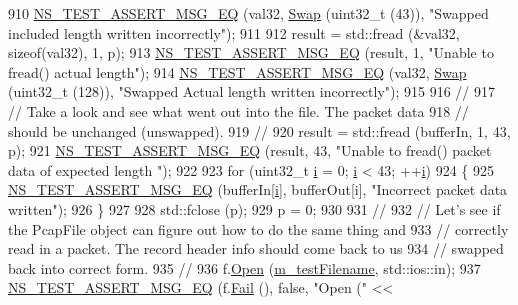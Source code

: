 \begin{DoxyCode}
910   \hyperlink{group__testing_ga2a9d78cffb3db8e867c35fff0b698cf5}{NS\_TEST\_ASSERT\_MSG\_EQ} (val32, \hyperlink{pcap-file-test-suite_8cc_a9baeceaeb66adfc7bddae33a81ad8fa7}{Swap} (uint32\_t (43)), \textcolor{stringliteral}{"Swapped included length
       written incorrectly"});
911 
912   result = std::fread (&val32, \textcolor{keyword}{sizeof}(val32), 1, p);
913   \hyperlink{group__testing_ga2a9d78cffb3db8e867c35fff0b698cf5}{NS\_TEST\_ASSERT\_MSG\_EQ} (result, 1, \textcolor{stringliteral}{"Unable to fread() actual length"});
914   \hyperlink{group__testing_ga2a9d78cffb3db8e867c35fff0b698cf5}{NS\_TEST\_ASSERT\_MSG\_EQ} (val32, \hyperlink{pcap-file-test-suite_8cc_a9baeceaeb66adfc7bddae33a81ad8fa7}{Swap} (uint32\_t (128)), \textcolor{stringliteral}{"Swapped Actual length
       written incorrectly"});
915 
916   \textcolor{comment}{//}
917   \textcolor{comment}{// Take a look and see what went out into the file.  The packet data}
918   \textcolor{comment}{// should be unchanged (unswapped).}
919   \textcolor{comment}{//}
920   result = std::fread (bufferIn, 1, 43, p);
921   \hyperlink{group__testing_ga2a9d78cffb3db8e867c35fff0b698cf5}{NS\_TEST\_ASSERT\_MSG\_EQ} (result, 43, \textcolor{stringliteral}{"Unable to fread() packet data of expected length
      "});
922 
923   \textcolor{keywordflow}{for} (uint32\_t \hyperlink{bernuolliDistribution_8m_a6f6ccfcf58b31cb6412107d9d5281426}{i} = 0; \hyperlink{bernuolliDistribution_8m_a6f6ccfcf58b31cb6412107d9d5281426}{i} < 43; ++\hyperlink{bernuolliDistribution_8m_a6f6ccfcf58b31cb6412107d9d5281426}{i})
924     \{
925       \hyperlink{group__testing_ga2a9d78cffb3db8e867c35fff0b698cf5}{NS\_TEST\_ASSERT\_MSG\_EQ} (bufferIn[\hyperlink{bernuolliDistribution_8m_a6f6ccfcf58b31cb6412107d9d5281426}{i}], bufferOut[i], \textcolor{stringliteral}{"Incorrect packet data
       written"});
926     \}
927 
928   std::fclose (p);
929   p = 0;
930 
931   \textcolor{comment}{//}
932   \textcolor{comment}{// Let's see if the PcapFile object can figure out how to do the same thing and}
933   \textcolor{comment}{// correctly read in a packet.  The record header info should come back to us}
934   \textcolor{comment}{// swapped back into correct form.}
935   \textcolor{comment}{//}
936   f.\hyperlink{classns3_1_1PcapFile_a064e8494e28e823d0bb4e40549f9f483}{Open} (\hyperlink{classRecordHeaderTestCase_a120cda070e5262333c795ce77359528e}{m\_testFilename}, std::ios::in);
937   \hyperlink{group__testing_ga2a9d78cffb3db8e867c35fff0b698cf5}{NS\_TEST\_ASSERT\_MSG\_EQ} (f.\hyperlink{classns3_1_1PcapFile_a2e00aa080890a0c9c3e9f5bd2d6c21d5}{Fail} (), \textcolor{keyword}{false}, \textcolor{stringliteral}{"Open ("} << 

\end{DoxyCode}
